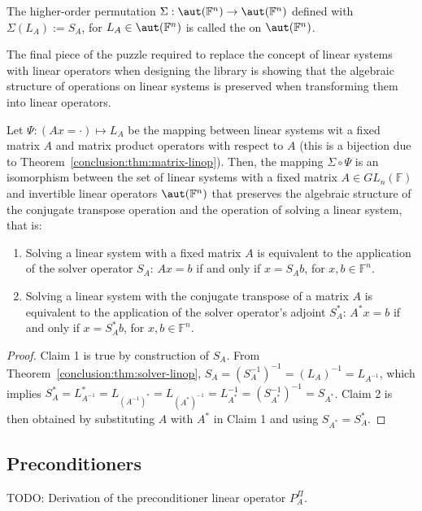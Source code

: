 \begin{definition}
\label{conclusion:def:solver-factory}
The higher-order permutation $\Sigma : \aut(\mathbb{F}^n) \rightarrow
\aut(\mathbb{F}^n)$ defined with $\Sigma(L_A) := S_A$, for $L_A \in
\aut(\mathbb{F}^n)$ is called the  on
$\aut(\mathbb{F}^n)$.
\end{definition}

The final piece of the puzzle required to replace the concept of linear systems
with linear operators when designing the library is showing that the algebraic
structure of operations on linear systems is preserved when transforming them
into linear operators.

\begin{corollary}
\label{conclusion:cor:solver-linop}
Let $\Psi : (Ax = \cdot) \mapsto L_A$ be the mapping between linear systems wit
a fixed matrix $A$ and matrix product operators with respect to $A$ (this is a
bijection due to Theorem~\ref{conclusion:thm:matrix-linop}).
Then, the mapping $\Sigma \circ \Psi$ is an isomorphism between the set of
linear systems with a fixed matrix $A \in GL_n(\mathbb{F})$ and invertible
linear operators $\aut(\mathbb{F}^n)$ that preserves the algebraic structure of
the conjugate transpose operation and the operation of solving a linear system,
that is:
\begin{enumerate}
\item Solving a linear system with a fixed matrix $A$ is equivalent to the
application of the solver operator $S_A$: $Ax = b$ if and only if $x = S_Ab$,
for $x, b \in \mathbb{F}^n$.
\item Solving a linear system with the conjugate transpose of a matrix $A$ is
equivalent to the application of the solver operator's adjoint $S_A^*$:
$A^*x = b$ if and only if $x = S_A^*b$, for $x, b \in \mathbb{F}^n$.
\end{enumerate}
\end{corollary}

\begin{proof}
Claim 1 is true by construction of $S_A$. From
Theorem~\ref{conclusion:thm:solver-linop}, $S_A = (S_A^{-1})^{-1} = (L_A)^{-1} =
L_{A^{-1}}$, which implies $S_A^* = L_{A^{-1}}^* = L_{(A^{-1})^*} =
L_{(A^*)^{-1}} = L_{A^*}^{-1} = (S_{A^*}^{-1})^{-1} = S_{A^*}$. Claim 2 is then
obtained by substituting $A$ with $A^*$ in Claim 1 and using $S_{A^*} = S_A^*$.
\end{proof}

\subsection{Preconditioners}
TODO: Derivation of the preconditioner linear operator $P^\Pi_A$.

